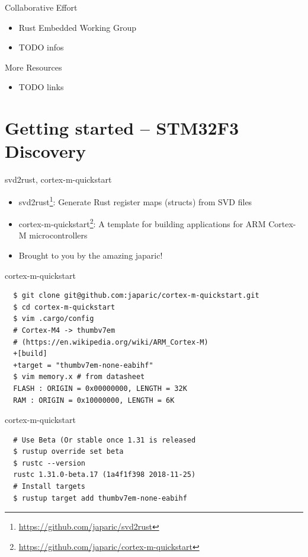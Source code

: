 \documentclass[aspectratio=1610,14pt,t]{beamer}
\begin{document}
\begin{frame}[c]{Collaborative Effort}
  \begin{itemize}
    \item Rust Embedded Working Group
    \item TODO infos
  \end{itemize}
\end{frame}

\begin{frame}[c]{More Resources}
  \begin{itemize}
    \item TODO links
  \end{itemize}
\end{frame}

\section{Getting started – STM32F3 Discovery}

\begin{frame}[c]{svd2rust, cortex-m-quickstart}
  \begin{itemize}
    \item svd2rust\footnote{\url{https://github.com/japaric/svd2rust}}:
      Generate Rust register maps (structs) from SVD files
    \item cortex-m-quickstart\footnote{\url{https://github.com/japaric/cortex-m-quickstart}}:
      A template for building applications for ARM Cortex-M microcontrollers
    \item<2-> Brought to you by the amazing japaric!
  \end{itemize}
\end{frame}


\begin{frame}[c,fragile]{cortex-m-quickstart}
  \begin{verbatim}
  $ git clone git@github.com:japaric/cortex-m-quickstart.git
  $ cd cortex-m-quickstart
  $ vim .cargo/config
  # Cortex-M4 -> thumbv7em
  # (https://en.wikipedia.org/wiki/ARM_Cortex-M)
  +[build]
  +target = "thumbv7em-none-eabihf"
  $ vim memory.x # from datasheet
  FLASH : ORIGIN = 0x00000000, LENGTH = 32K
  RAM : ORIGIN = 0x10000000, LENGTH = 6K
  \end{verbatim}
\end{frame}

\begin{frame}[c,fragile]{cortex-m-quickstart}
  \begin{verbatim}
  # Use Beta (Or stable once 1.31 is released
  $ rustup override set beta
  $ rustc --version
  rustc 1.31.0-beta.17 (1a4f1f398 2018-11-25)
  # Install targets
  $ rustup target add thumbv7em-none-eabihf
  \end{verbatim}
\end{frame}
\end{document}
